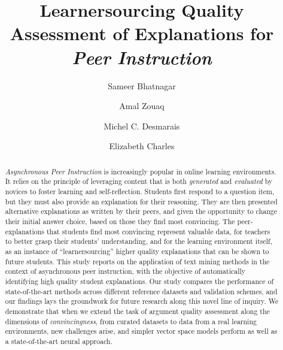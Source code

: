\documentclass[runningheads]{llncs}
\begin{document}
%
\title{Learnersourcing Quality Assessment of Explanations for \textit{Peer 
Instruction}}
%
\author{Sameer Bhatnagar \and
Amal Zouaq \and
Michel C. Desmarais \and
Elizabeth Charles
}
%

%
\maketitle              %
%
\begin{abstract}
\textit{Asynchronous Peer Instruction} is increasingly popular in 
online learning environments. It relies on the principle of 
leveraging content that is both \textit{generated} and \textit{evaluated} by 
novices to foster learning and self-reflection. 
Students first respond to a question item, but 
they must also provide an explanation for their reasoning. 
They are then presented alternative explanations as written by their peers, and 
given the opportunity to change their initial answer choice, based on those 
they find most convincing. 
The peer-explanations that students find most convincing represent valuable 
data, for teachers to better grasp their students' understanding, and for the 
learning environment itself, as an instance of ``learnersourcing'' higher 
quality explanations that can be shown to future students. 
This study reports on the application of text mining methods in the 
context of asynchronous peer instruction, with the objective of automatically 
identifying high quality student explanations. 
Our study compares the performance of state-of-the-art methods across different 
reference datasets and validation schemes, and our findings lays the groundwork 
for future research along this novel line of inquiry. 
We demonstrate that when we extend the task of argument quality assessment 
along the dimensions of \textit{convincingness}, from curated datasets to data 
from a real learning environments, new challenges arise, and simpler vector 
space models perform as well as a state-of-the-art neural approach. 

\end{abstract}
\end{document}
